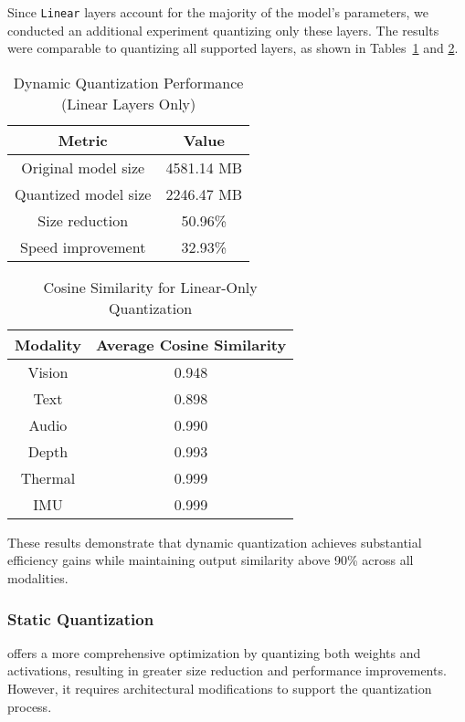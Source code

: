\documentclass[runningheads]{IEEEtran}
\begin{document}
Since \texttt{Linear} layers account for the majority of the model's parameters, we conducted an additional experiment quantizing only these layers. The results were comparable to quantizing all supported layers, as shown in Tables~\ref{tab:dynamic_quant_linear} and \ref{tab:dynamic_quant_linear_cosine}.

\begin{table}[ht]
\caption{Dynamic Quantization Performance (Linear Layers Only)}
\label{tab:dynamic_quant_linear}
\centering
\begin{tabular}{|c|c|}
\hline
\textbf{Metric} & \textbf{Value} \\
\hline
Original model size & 4581.14 MB \\
Quantized model size & 2246.47 MB \\
Size reduction & 50.96\% \\
Speed improvement & 32.93\% \\
\hline
\end{tabular}
\end{table}

\begin{table}[ht]
\caption{Cosine Similarity for Linear-Only Quantization}
\label{tab:dynamic_quant_linear_cosine}
\centering
\begin{tabular}{|c|c|}
\hline
\textbf{Modality} & \textbf{Average Cosine Similarity} \\
\hline
Vision & 0.948 \\
Text & 0.898 \\
Audio & 0.990 \\
Depth & 0.993 \\
Thermal & 0.999 \\
IMU & 0.999 \\
\hline
\end{tabular}
\end{table}

These results demonstrate that dynamic quantization achieves substantial efficiency gains while maintaining output similarity above 90\% across all modalities.

\subsubsection{Static Quantization}

offers a more comprehensive optimization by quantizing both weights and activations, resulting in greater size reduction and performance improvements. However, it requires architectural modifications to support the quantization process.
\end{document}

